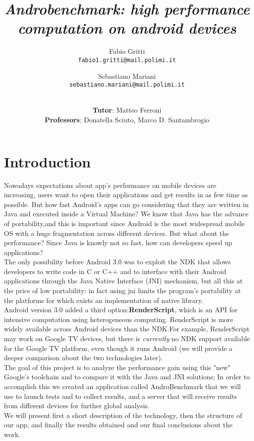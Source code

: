 \documentclass[11pt,english]{article}
\begin{document}
\title{\textit{Androbenchmark: high performance computation on android devices}}
\author{
  Fabio Gritti\\
  \texttt{fabio1.gritti@mail.polimi.it}
  \and
  Sebastiano Mariani\\
  \texttt{sebastiano.mariani@mail.polimi.it}
  \and \\
 \textbf{ Tutor}: Matteo Ferroni\\
  \textbf{Professors}: Donatella Sciuto, Marco D. Santambrogio
}
\date{}
\maketitle

\pagestyle{plain}
\tableofcontents

\section{Introduction}
Nowadays expectations about app's performance on mobile devices are increasing, users want to open their applications and get results in as few time as possible. But how fast Android's apps can go considering that they are written in Java and executed inside a Virtual Machine? 
We know that Java has the advance of portability,and this is important since Android is the most widespread mobile OS with a huge fragmentation\cite{fr} across different devices. But what about the performance? Since Java is knowly not so fast, how can developers speed up applications?\\
The only possibility before Android 3.0 was to exploit the NDK\cite{ndk} that allows developers to write code in C or C++ and to interface with their Android applications through the Java Native Interface (JNI) mechanism, but all this at the price of low portability: in fact using jni limits the program's portability at the platforms for which exists an implementation of native library.\\Android version 3.0 added a third option:\textbf{RenderScript}, which is an API for intensive computation using heterogeneous computing. RenderScript is more widely available across Android devices than the NDK.For example, RenderScript may work on Google TV devices, but there is \textit{currently} no NDK support available for the Google TV platform, even though it runs Android (we will provide a deeper comparison about the two technologies later).\\The goal of this project is to analyze the performance gain using this "new" Google's toolchain and to compare it with the Java and JNI solutions; In order to accomplish this we created an application called AndroBenchmark that we will use to launch tests and to collect results, and a server that will receive results from different devices for further global analysis.\\We will present first a short description of the technology, then the structure of our app, and finally the results obtained and our final conclusions about the work.
\end{document}
